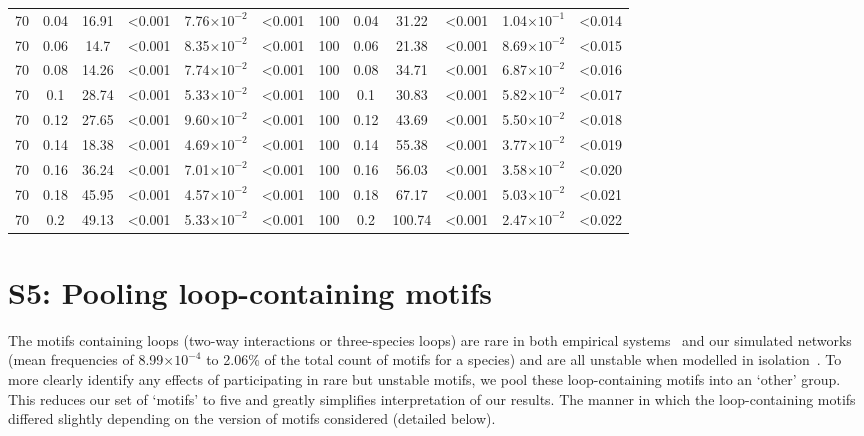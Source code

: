 \documentclass[12pt]{article}
\begin{document}
\begin{spacing}{2.0}
\begin{table}[hb!]
\begin{tabular}{c c | c c| c c ||c c | c c | c c |}
            70  & 0.04  & 16.91 & \textless0.001  & 7.76$\times10^{-2}$ & \textless0.001  & 100 & 0.04  & 31.22 & \textless0.001  & 1.04$\times10^{-1}$ & \textless0.014  \\
            70  & 0.06  & 14.7  & \textless0.001  & 8.35$\times10^{-2}$ & \textless0.001  & 100 & 0.06  & 21.38 & \textless0.001  & 8.69$\times10^{-2}$ & \textless0.015  \\
            70  & 0.08  & 14.26 & \textless0.001  & 7.74$\times10^{-2}$ & \textless0.001  & 100 & 0.08  & 34.71 & \textless0.001  & 6.87$\times10^{-2}$ & \textless0.016  \\
            70  & 0.1 & 28.74 & \textless0.001  & 5.33$\times10^{-2}$ & \textless0.001  & 100 & 0.1 & 30.83 & \textless0.001  & 5.82$\times10^{-2}$ & \textless0.017  \\
            70  & 0.12  & 27.65 & \textless0.001  & 9.60$\times10^{-2}$ & \textless0.001  & 100 & 0.12  & 43.69 & \textless0.001  & 5.50$\times10^{-2}$ & \textless0.018  \\
            70  & 0.14  & 18.38 & \textless0.001  & 4.69$\times10^{-2}$ & \textless0.001  & 100 & 0.14  & 55.38 & \textless0.001  & 3.77$\times10^{-2}$ & \textless0.019  \\
            70  & 0.16  & 36.24 & \textless0.001  & 7.01$\times10^{-2}$ & \textless0.001  & 100 & 0.16  & 56.03 & \textless0.001  & 3.58$\times10^{-2}$ & \textless0.020  \\
            70  & 0.18  & 45.95 & \textless0.001  & 4.57$\times10^{-2}$ & \textless0.001  & 100 & 0.18  & 67.17 & \textless0.001  & 5.03$\times10^{-2}$ & \textless0.021  \\
            70  & 0.2 & 49.13 & \textless0.001  & 5.33$\times10^{-2}$ & \textless0.001  & 100 & 0.2 & 100.74  & \textless0.001  & 2.47$\times10^{-2}$ & \textless0.022  \\
        \hline
	    \end{tabular}
	    \end{table}


\clearpage


\section*{S5: Pooling loop-containing motifs} 
	
	The motifs containing loops (two-way interactions or three-species loops) are rare in both empirical systems~\citep{Stouffer2007} and our simulated networks (mean frequencies of 8.99$\times10^{-4}$ to 2.06\% of the total count of motifs for a species) and are all unstable when modelled in isolation~\citep{Borrelli2015a}.
	To more clearly identify any effects of participating in rare but unstable motifs, we pool these loop-containing motifs into an `other' group.
	This reduces our set of `motifs' to five and greatly simplifies interpretation of our results.
	The manner in which the loop-containing motifs differed slightly depending on the version of motifs considered (detailed below).



\end{spacing}
\end{document}
